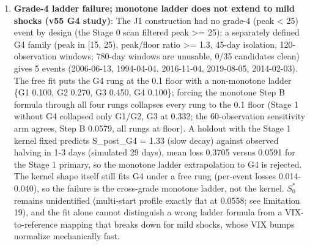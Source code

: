 \documentclass[11pt]{article}
\begin{document}
\begin{enumerate}
\item \textbf{Grade-4 ladder failure; monotone ladder does not extend to mild shocks (v55 G4 study)}: The J1 construction had no grade-4 (peak < 25) event by design (the Stage 0 scan filtered peak >= 25); a separately defined G4 family (peak in [15, 25), peak/floor ratio >= 1.3, 45-day isolation, 120-observation windows; 780-day windows are unusable, 0/35 candidates clean) gives 5 events (2006-06-13, 1994-04-04, 2016-11-04, 2019-08-05, 2014-02-03). The free fit puts the G4 rung at the 0.1 floor with a non-monotone ladder \{G1 0.100, G2 0.270, G3 0.450, G4 0.100\}; forcing the monotone Step B formula through all four rungs collapses every rung to the 0.1 floor (Stage 1 without G4 collapsed only G1/G2, G3 at 0.332; the 60-observation sensitivity arm agrees, Step B 0.0579, all rungs at floor). A holdout with the Stage 1 kernel fixed predicts S\_post\_G4 = 1.33 (slow decay) against observed halving in 1-3 days (simulated 29 days), mean loss 0.3705 versus 0.0591 for the Stage 1 primary, so the monotone ladder extrapolation to G4 is rejected. The kernel shape itself still fits G4 under a free rung (per-event losses 0.014-0.040), so the failure is the cross-grade monotone ladder, not the kernel. $S_0^*$ remains unidentified (multi-start profile exactly flat at 0.0558; see limitation 19), and the fit alone cannot distinguish a wrong ladder formula from a VIX-to-reference mapping that breaks down for mild shocks, whose VIX bumps normalize mechanically fast.

\end{enumerate}
\end{document}
